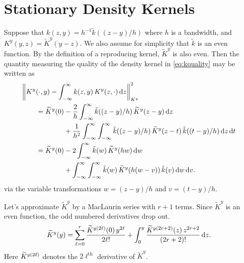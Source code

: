 \documentclass{amsart}
\newcommand{\KY}{K^y}
\newcommand{\tKY}{\widetilde{K}^y}
\newcommand{\tk}{\tilde{k}}
\begin{document}
\section{Stationary Density Kernels}

Suppose that $k(z,y) = h^{-1}\tk((z-y)/h)$ where $h$ is a bandwidth, and $\KY(y,z) = \tKY(y-z)$.  We also assume for simplicity that $\tk$ is an even function.  By the definition of a reproducing kernel, $\tKY$ is also even. Then the quantity measuring the quality of the density kernel in \eqref{eq:kquality} may be written as
\begin{align*}
	\MoveEqLeft{\norm[\KY]{\KY(\cdot,y) - \int_{-\infty}^{\infty} k(z,y) \, \KY(z,\cdot) \, \dif z}^2} \\
	&=  \tKY(0) -  \frac 2h \int_{-\infty}^{\infty} \tk((z-y)/h) \, \tKY(z-y) \, \dif z \\
	& \qquad \qquad + \frac 1{h^2} \int_{-\infty}^{\infty} \int_{-\infty}^{\infty}  \tk((z-y)/h)  \, \tKY(z-t) \, \tk((t-y)/h) \, \dif z \, \dif t \\
	&=   \tKY(0) - 2 \int_{-\infty}^{\infty} \tk(w) \, \tKY(hw) \, \dif w \\
	& \qquad \qquad + \int_{-\infty}^{\infty} \int_{-\infty}^{\infty}  \tk(w) \, \tKY(h(w-v)) \, \tk(v)\, \dif w \, \dif v
	.
\end{align*}
via the variable transformations $w = (z-y)/h$ and $v = (t-y)/h$.

Let's approximate $\tKY$ by a MacLaurin series with $r+1$ terms.  Since $\tKY$ is an even function, the odd numbered derivatives drop out.
\begin{equation*}
	\tKY(y)  = \sum_{\ell = 0}^{r} \frac{\tK^{y(2\ell)}(0) \, y^{2\ell}}{2\ell!} + \int_0^y \frac{\tK^{y(2r+2)}(z) \,  z^{2r+2}}{(2r+2)!} \, \dif z.
\end{equation*}
Here $\widetilde{K}^{y(2\ell)}$ denotes the $2\ell^{\text{th}}$ derivative of $\tKY$. 
\end{document}
